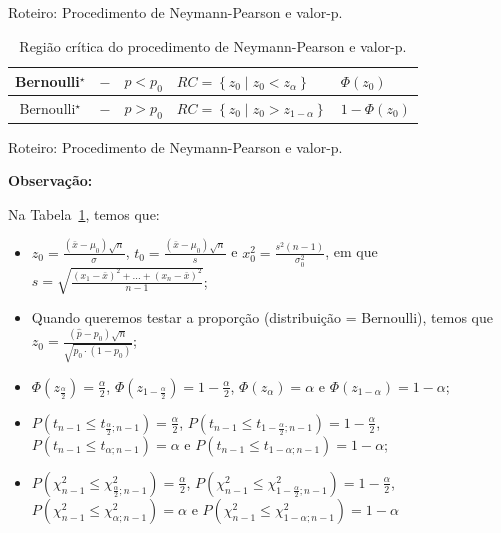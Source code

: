 \documentclass[8pt]{beamer}
\begin{document}
\begin{frame}{Roteiro: Procedimento de Neymann-Pearson e valor-p.}
\begin{table}[htbp]
{\begin{tabular}{c|c|c|l|l}
			Bernoulli$^\star$ & $-$ & $p < p_0$ & $RC = \left\{ z_0 \mid z_0 < z_{\alpha} \right\}$ & $ \Phi\left( z_0 \right) $ \\ \midrule[0.025cm]
			Bernoulli$^\star$ & $-$ & $p > p_0$ & $RC = \left\{ z_0 \mid z_0 > z_{1-\alpha} \right\}$ & $ 1- \Phi\left( z_0 \right) $ \\
			\bottomrule[0.05cm]
		\end{tabular}
	}
		\caption{\footnotesize Região crítica do procedimento de Neymann-Pearson e valor-p.}
		\label{tab:regiao-critica-valor-p}
	\end{table}


\end{frame}

\begin{frame}{Roteiro: Procedimento de Neymann-Pearson e valor-p.}

\small

\textbf{Observação:}

Na Tabela~\ref{tab:regiao-critica-valor-p}, temos que:
\begin{itemize}
	\item $z_0 =\frac{(\bar{x} - \mu_0)\sqrt{n}}{\sigma}$, $t_0=\frac{(\bar{x} - \mu_0)\sqrt{n}}{s}$ e $x_0^2 = \frac{s^2 (n-1)}{\sigma_0^2}$, em que $s = \sqrt{ \frac{(x_1- \bar{x})^2+ \dots + (x_n- \bar{x})^2}{n-1} }$;
	\vfill
	
	\item  Quando queremos testar a proporção (distribuição = Bernoulli), temos que $z_0 =\frac{(\hat{p} - p_0)\sqrt{n}}{\sqrt{p_0 \cdot (1 - p_0)}}$;
	\vfill
	
	\item $\Phi\left(z_\frac{\alpha}{2}\right)=\frac{\alpha}{2}$, $\Phi\left(z_{1-\frac{\alpha}{2}}\right)=1-\frac{\alpha}{2}$, $\Phi\left(z_\alpha\right)=\alpha$ e $\Phi\left(z_{1-\alpha}\right)=1-\alpha$;
	\vfill
	
	\item $P\left(t_{n-1} \leq t_{\frac{\alpha}{2}; n-1} \right) = \frac{\alpha}{2}$, $P\left(t_{n-1} \leq t_{1-\frac{\alpha}{2}; n-1} \right) = 1- \frac{\alpha}{2}$, $P\left(t_{n-1} \leq t_{\alpha; n-1} \right) = \alpha$ e $P\left(t_{n-1} \leq t_{1-\alpha; n-1} \right) = 1-\alpha$;
	\vfill
	
	\item $P\left( \chi_{n-1}^2 \leq \chi_{\frac{\alpha}{2};n-1}^2 \right)=\frac{\alpha}{2}$, $P\left( \chi_{n-1}^2 \leq \chi_{1-\frac{\alpha}{2};n-1}^2 \right)=1-\frac{\alpha}{2}$, $P\left( \chi_{n-1}^2 \leq \chi_{\alpha;n-1}^2 \right)=\alpha$ e $P\left( \chi_{n-1}^2 \leq \chi_{1- \alpha;n-1}^2 \right)=1- \alpha$
\end{itemize}

\normalsize 

\end{frame}
\end{document}
